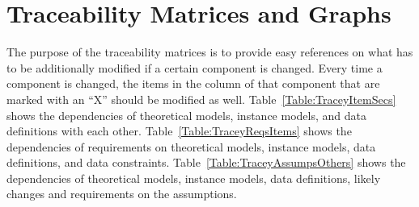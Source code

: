 \documentclass[12pt]{article}
\begin{document}
\section{Traceability Matrices and Graphs}
\label{Sec:TraceMatrices}
The purpose of the traceability matrices is to provide easy references on what has to be additionally modified if a certain component is changed. Every time a component is changed, the items in the column of that component that are marked with an ``X'' should be modified as well. Table~\ref{Table:TraceyItemSecs} shows the dependencies of theoretical models, instance models, and data definitions with each other. Table~\ref{Table:TraceyReqsItems} shows the dependencies of requirements on theoretical models, instance models, data definitions, and data constraints. Table~\ref{Table:TraceyAssumpsOthers} shows the dependencies of theoretical models, instance models, data definitions, likely changes and requirements on the assumptions.
\end{document}
